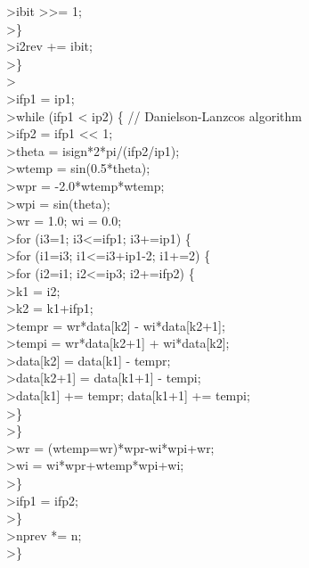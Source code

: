 {>\quad \qquad\qquad\qquad ibit >>= 1; \\
>\quad \qquad\qquad \} \\
>\quad \qquad\qquad i2rev += ibit; \\
>\quad \qquad \} \\
>\quad \\
>\quad \qquad ifp1 = ip1; \\
>\quad \qquad while (ifp1 < ip2) \{ // Danielson-Lanzcos algorithm \\
>\quad \qquad\qquad ifp2 = ifp1 << 1; \\
>\quad \qquad\qquad theta = isign*2*pi/(ifp2/ip1); \\
>\quad \qquad\qquad wtemp = sin(0.5*theta); \\
>\quad \qquad\qquad wpr = -2.0*wtemp*wtemp; \\
>\quad \qquad\qquad wpi = sin(theta); \\
>\quad \qquad\qquad wr = 1.0; wi = 0.0; \\
>\quad \qquad\qquad for (i3=1; i3<=ifp1; i3+=ip1) \{ \\
>\quad \qquad\qquad\qquad for (i1=i3; i1<=i3+ip1-2; i1+=2) \{ \\
>\quad \qquad\qquad\qquad\qquad for (i2=i1; i2<=ip3; i2+=ifp2) \{ \\
>\quad \qquad\qquad\qquad\qquad\qquad k1 = i2; \\
>\quad \qquad\qquad\qquad\qquad\qquad k2 = k1+ifp1; \\
>\quad \qquad\qquad\qquad\qquad\qquad tempr = wr*data[k2] - wi*data[k2+1]; \\
>\quad \qquad\qquad\qquad\qquad\qquad tempi = wr*data[k2+1] + wi*data[k2]; \\
>\quad \qquad\qquad\qquad\qquad\qquad data[k2] = data[k1] - tempr; \\
>\quad \qquad\qquad\qquad\qquad\qquad data[k2+1] = data[k1+1] - tempi; \\
>\quad \qquad\qquad\qquad\qquad\qquad data[k1] += tempr; data[k1+1] += tempi; \\
>\quad \qquad\qquad\qquad\qquad \} \\
>\quad \qquad\qquad\qquad \} \\
>\quad \qquad\qquad\qquad wr = (wtemp=wr)*wpr-wi*wpi+wr; \\
>\quad \qquad\qquad\qquad wi = wi*wpr+wtemp*wpi+wi; \\
>\quad \qquad\qquad \} \\
>\quad \qquad\qquad ifp1 = ifp2; \\
>\quad \qquad \} \\
>\quad \qquad nprev *= n; \\
>\quad \}
}


